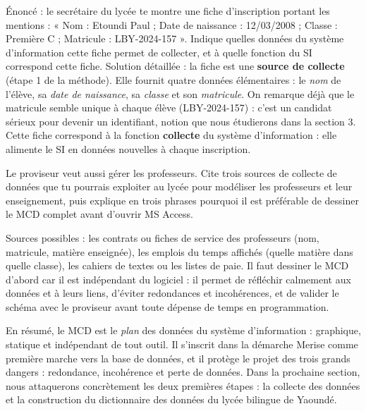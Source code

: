 \documentclass[11pt]{article}
\newcommand{\cle}[1]{{\popxbold\color{popdark}#1}}
\begin{document}
\begin{exoresolu}
Énoncé : le secrétaire du lycée te montre une fiche d'inscription portant les mentions : « Nom : Etoundi Paul ; Date de naissance : 12/03/2008 ; Classe : Première C ; Matricule : LBY-2024-157 ». Indique quelles données du système d'information cette fiche permet de collecter, et à quelle fonction du SI correspond cette fiche.
\tcblower
Solution détaillée : la fiche est une \textbf{source de collecte} (étape 1 de la méthode). Elle fournit quatre données élémentaires : le \emph{nom} de l'élève, sa \emph{date de naissance}, sa \emph{classe} et son \emph{matricule}. On remarque déjà que le matricule semble unique à chaque élève (LBY-2024-157) : c'est un candidat sérieux pour devenir un \cle{identifiant}, notion que nous étudierons dans la section 3. Cette fiche correspond à la fonction \textbf{collecte} du système d'information : elle alimente le SI en données nouvelles à chaque inscription.
\end{exoresolu}

\begin{exercice}
Le proviseur veut aussi gérer les professeurs. Cite trois sources de collecte de données que tu pourrais exploiter au lycée pour modéliser les professeurs et leur enseignement, puis explique en trois phrases pourquoi il est préférable de dessiner le MCD complet avant d'ouvrir MS Access.
\end{exercice}

\begin{corrige}[Exercice 1]
Sources possibles : les contrats ou fiches de service des professeurs (nom, matricule, matière enseignée), les emplois du temps affichés (quelle matière dans quelle classe), les cahiers de textes ou les listes de paie. Il faut dessiner le MCD d'abord car il est indépendant du logiciel : il permet de réfléchir calmement aux données et à leurs liens, d'éviter redondances et incohérences, et de valider le schéma avec le proviseur avant toute dépense de temps en programmation.
\end{corrige}

En résumé, le MCD est le \emph{plan} des données du système d'information : graphique, statique et indépendant de tout outil. Il s'inscrit dans la démarche Merise comme première marche vers la base de données, et il protège le projet des trois grands dangers : redondance, incohérence et perte de données. Dans la prochaine section, nous attaquerons concrètement les deux premières étapes : la collecte des données et la construction du dictionnaire des données du lycée bilingue de Yaoundé.
\end{document}

